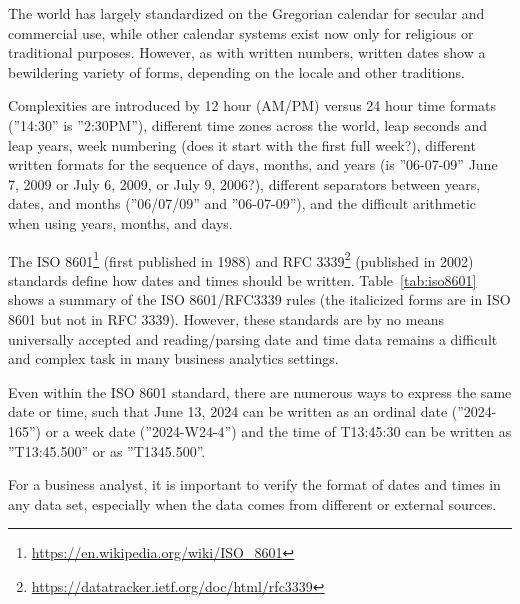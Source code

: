 The world has largely standardized on the Gregorian calendar for secular and commercial use, while other calendar systems exist now only for religious or traditional purposes. However, as with written numbers, written dates show a bewildering variety of forms, depending on the locale and other traditions.

Complexities are introduced by 12 hour (AM/PM) versus 24 hour time formats (''14:30'' is ''2:30PM''), different time zones across the world, leap seconds and leap years, week numbering (does it start with the first full week?), different written formats for the sequence of days, months, and years (is ''06-07-09'' June 7, 2009 or July 6, 2009, or July 9, 2006?), different separators between years, dates, and months (''06/07/09'' and ''06-07-09''), and the difficult arithmetic when using years, months, and days. 

The ISO 8601\footnote{\url{https://en.wikipedia.org/wiki/ISO_8601}} (first published in 1988) and RFC 3339\footnote{\url{https://datatracker.ietf.org/doc/html/rfc3339}} (published in 2002) standards define how dates and times should be written. Table~\ref{tab:iso8601} shows a summary of the ISO 8601/RFC3339 rules (the italicized forms are in ISO 8601 but not in RFC 3339). However, these standards are by no means universally accepted and reading/parsing date and time data remains a difficult and complex task in many business analytics settings. 

Even within the ISO 8601 standard, there are numerous ways to express the same date or time, such that June 13, 2024 can be written as an ordinal date (''2024-165'') or a week date (''2024-W24-4'') and the time of T13:45:30 can be written as ''T13:45.500'' or as ''T1345.500''. 

\begin{tcolorbox}[colback=alert]
For a business analyst, it is important to verify the format of dates and times in any data set, especially when the data comes from different or external sources.
\end{tcolorbox}

